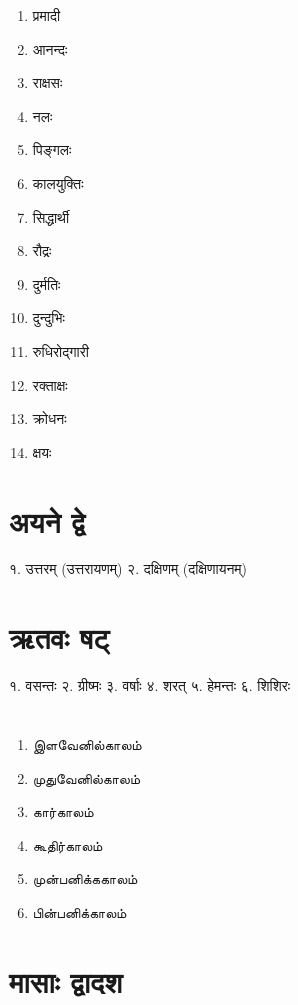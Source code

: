 \begin{multicols}{3}
\begin{enumerate}
\item प्रमादी 
\item आनन्दः 
\item राक्षसः 
\item नलः 
\item पिङ्गलः 
\item कालयुक्तिः 
\item सिद्धार्थी 
\item रौद्रः 
\item दुर्मतिः 
\item दुन्दुभिः 
\item रुधिरोद्गारी 
\item रक्ताक्षः 
\item क्रोधनः 
\item क्षयः
\end{enumerate}
\end{multicols}

\section*{अयने द्वे}
१. उत्तरम् (उत्तरायणम्)\hspace{2em}
२. दक्षिणम् (दक्षिणायनम्)


\section*{ऋतवः षट्}

१. वसन्तः २. ग्रीष्मः 
३. वर्षाः ४. शरत् 
५. हेमन्तः ६. शिशिरः 


\tamfamily
\section*{}

\begin{multicols}{2}
\renewcommand{\labelenumi}{\theenumi.}
\begin{enumerate}\itemsep-1ex
    \item இளவேனில்காலம் 
    \item  முதுவேனில்காலம் 
    \item  கார்காலம் 
    \item  கூதிர்காலம் 
    \item  முன்பனிக்ககாலம் 
    \item  பின்பனிக்காலம் 
\end{enumerate}
\end{multicols}
 
\dngfamily

\section*{मासाः द्वादश}

